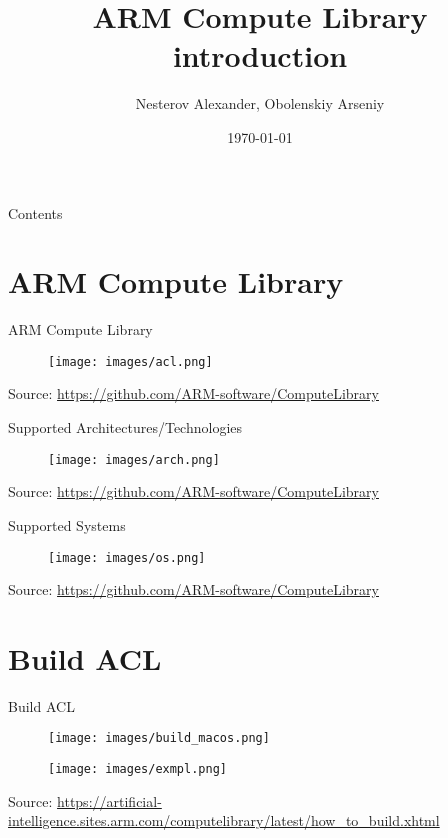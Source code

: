\documentclass{beamer}
\title[ARM Compute Library introduction]{ARM Compute Library introduction}
\author{Nesterov Alexander, Obolenskiy Arseniy}
\institute{ITLab}
\date{\today}
\begin{document}
\begin{frame}
    \titlepage%
\end{frame}

\begin{frame}{Contents}
    \tableofcontents
\end{frame}

\section{ARM Compute Library}
\begin{frame}{ARM Compute Library}
  \begin{figure}[h]
    \texttt{[image: images/acl.png]}
  \end{figure}
  \footnotesize Source: \href{https://github.com/ARM-software/ComputeLibrary}{https://github.com/ARM-software/ComputeLibrary}
\end{frame}

\begin{frame}{Supported Architectures/Technologies}
  \begin{figure}[h]
    \texttt{[image: images/arch.png]}
  \end{figure}
  \footnotesize Source: \href{https://github.com/ARM-software/ComputeLibrary}{https://github.com/ARM-software/ComputeLibrary}
\end{frame}

\begin{frame}{Supported Systems}
  \begin{figure}[h]
    \texttt{[image: images/os.png]}
  \end{figure}
  \footnotesize Source: \href{https://github.com/ARM-software/ComputeLibrary}{https://github.com/ARM-software/ComputeLibrary}
\end{frame}

\section{Build ACL}
\begin{frame}{Build ACL}
  \begin{figure}[h]
    \texttt{[image: images/build\_macos.png]}
  \end{figure}
  \begin{figure}[h]
    \texttt{[image: images/exmpl.png]}
  \end{figure}
  \footnotesize Source: \href{https://artificial-intelligence.sites.arm.com/computelibrary/latest/how_to_build.xhtml}{https://artificial-intelligence.sites.arm.com/computelibrary/latest/how\_to\_build.xhtml}
\end{frame}
\end{document}
